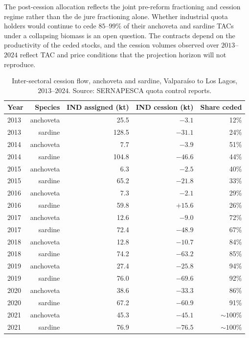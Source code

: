 \documentclass[
  11pt,
]{article}
\begin{document}
The post-cession allocation reflects the joint pre-reform fractioning and cession regime rather than the de jure fractioning alone. Whether industrial quota holders would continue to cede \(85\)--\(99\%\) of their anchoveta and sardine TACs under a collapsing biomass is an open question. The contracts depend on the productivity of the ceded stocks, and the cession volumes observed over \(2013\)--\(2024\) reflect TAC and price conditions that the projection horizon will not reproduce.

\begin{table}[H]
\centering\small
\renewcommand{\arraystretch}{0.95}
\caption{Inter-sectoral cession flow, anchoveta and sardine, Valparaíso to Los Lagos, $2013$--$2024$. Source: SERNAPESCA quota control reports.\label{tab:cesiones-anchsard}}
\begin{threeparttable}
\begin{tabular}{lrrrr}
\toprule
Year & Species & IND assigned (kt) & IND cession (kt) & Share ceded \\
\midrule
2013 & anchoveta &  25.5 & $-3.1$  & 12\% \\
2013 & sardine   & 128.5 & $-31.1$ & 24\% \\
2014 & anchoveta &   7.7 & $-3.9$  & 51\% \\
2014 & sardine   & 104.8 & $-46.6$ & 44\% \\
2015 & anchoveta &   6.3 & $-2.5$  & 40\% \\
2015 & sardine   &  65.2 & $-21.8$ & 33\% \\
2016 & anchoveta &   7.3 & $-2.1$  & 29\% \\
2016 & sardine   &  59.8 & $+15.6$ & 26\% \\
2017 & anchoveta &  12.6 & $-9.0$  & 72\% \\
2017 & sardine   &  72.4 & $-48.9$ & 67\% \\
2018 & anchoveta &  12.8 & $-10.7$ & 84\% \\
2018 & sardine   &  74.2 & $-63.2$ & 85\% \\
2019 & anchoveta &  27.4 & $-25.8$ & 94\% \\
2019 & sardine   &  76.0 & $-69.6$ & 92\% \\
2020 & anchoveta &  38.6 & $-33.3$ & 86\% \\
2020 & sardine   &  67.2 & $-60.9$ & 91\% \\
2021 & anchoveta &  45.3 & $-45.1$ & $\sim\!100\%$ \\
2021 & sardine   &  76.9 & $-76.5$ & $\sim\!100\%$ \\

\end{tabular}
\end{threeparttable}
\end{table}
\end{document}

